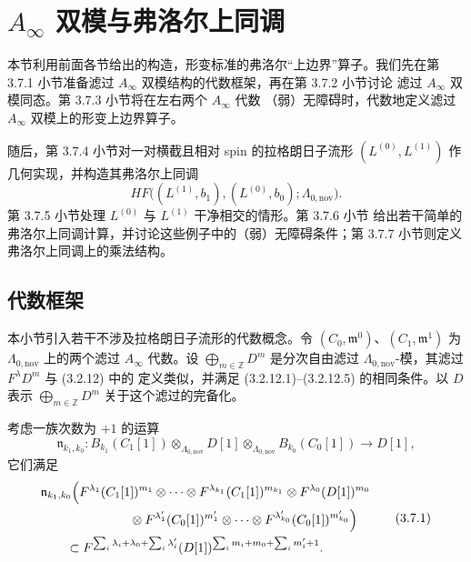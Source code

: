 
\section{$A_\infty$ 双模与弗洛尔上同调}
\label{sec:3-7}

本节利用前面各节给出的构造，形变标准的弗洛尔“上边界”算子。我们先在第
3.7.1 小节准备滤过 $A_\infty$ 双模结构的代数框架，再在第 3.7.2 小节讨论
滤过 $A_\infty$ 双模同态。第 3.7.3 小节将在左右两个 $A_\infty$ 代数
（弱）无障碍时，代数地定义滤过 $A_\infty$ 双模上的形变上边界算子。

随后，第 3.7.4 小节对一对横截且相对 spin 的拉格朗日子流形
$(L^{(0)},L^{(1)})$ 作几何实现，并构造其弗洛尔上同调
\[
  HF\bigl((L^{(1)},b_1),(L^{(0)},b_0);\Lambda_{0,\mathrm{nov}}\bigr).
\]
第 3.7.5 小节处理 $L^{(0)}$ 与 $L^{(1)}$ 干净相交的情形。第 3.7.6 小节
给出若干简单的弗洛尔上同调计算，并讨论这些例子中的（弱）无障碍条件；第
3.7.7 小节则定义弗洛尔上同调上的乘法结构。

\subsection{代数框架}
\label{subsec:3-7-1}

本小节引入若干不涉及拉格朗日子流形的代数概念。令
$(C_0,\mathfrak m^0)$、$(C_1,\mathfrak m^1)$ 为
$\Lambda_{0,\mathrm{nov}}$ 上的两个滤过 $A_\infty$ 代数。设
$\bigoplus_{m\in\mathbb Z}D^m$ 是分次自由滤过
$\Lambda_{0,\mathrm{nov}}$-模，其滤过 $F^\lambda D^m$ 与 (3.2.12) 中的
定义类似，并满足 (3.2.12.1)--(3.2.12.5) 的相同条件。以 $D$ 表示
$\bigoplus_{m\in\mathbb Z}D^m$ 关于这个滤过的完备化。

考虑一族次数为 $+1$ 的运算
\[
  \mathfrak n_{k_1,k_0}\colon
  B_{k_1}(C_1[1])\otimes_{\Lambda_{0,\mathrm{nov}}}D[1]
  \otimes_{\Lambda_{0,\mathrm{nov}}}B_{k_0}(C_0[1])
  \longrightarrow D[1],
\]
它们满足
\begin{equation}
\begin{aligned}
&\mathfrak n_{k_1,k_0}\Bigl(
  F^{\lambda_1}(C_1[1])^{m_1}\otimes\cdots\otimes
  F^{\lambda_{k_1}}(C_1[1])^{m_{k_1}}
  \otimes F^{\lambda_0}(D[1])^{m_0}\\
&\hspace{7em}{}\otimes
  F^{\lambda'_1}(C_0[1])^{m'_1}\otimes\cdots\otimes
  F^{\lambda'_{k_0}}(C_0[1])^{m'_{k_0}}
  \Bigr)\\
&\qquad\subset
  F^{\sum_i\lambda_i+\lambda_0+\sum_i\lambda'_i}
  (D[1])^{\sum_i m_i+m_0+\sum_i m'_i+1}.
\end{aligned}
\tag{3.7.1}\label{eq:3-7-1}
\end{equation}

